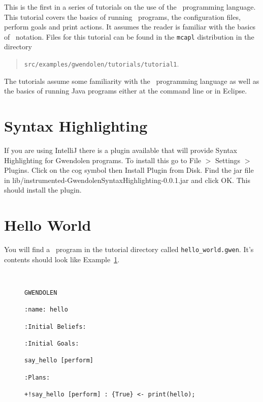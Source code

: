 \label{tutorial:gwendolen:introduction}
This is the first in a series of tutorials on the use of
the \gwendolen\ programming language.  This tutorial
covers the basics of running \gwendolen\
programs, the configuration
files, perform
goals and print
actions.  It assumes the reader is
familiar with the basics of \prolog\ notation.  Files for this
tutorial can be found in the
\texttt{mcapl} distribution in the directory
\begin{quote}
\texttt{src/examples/gwendolen/tutorials/tutorial1}.
\end{quote}
%
The tutorials assume some familiarity with the \prolog\ programming
language as well as the basics of running Java programs either at the
command line or in Eclipse.

\section{Syntax Highlighting}
If you are using IntelliJ there is a plugin available that will provide Syntax Highlighting for Gwendolen programs.  To install this go to File $>$ Settings $>$ Plugins.  Click on the cog symbol then Install Plugin from Disk.  Find the jar file in lib/instrumented-GwendolenSyntaxHighlighting-0.0.1.jar and click OK.  This should install the plugin.

\section{Hello World}

\begin{sloppypar}
You will find a \gwendolen\ program in the tutorial directory
called \texttt{hello\_world.gwen}.
It's contents should look like Example~\ref{code:hello_world}.
\end{sloppypar}
\begin{figure}[htb]
\begin{ourexample}
\label{code:hello_world} \quad \\
\begin{lstlisting}[basicstyle=\footnotesize\sffamily,language=Gwendolen,style=easslisting]
GWENDOLEN

:name: hello

:Initial Beliefs:

:Initial Goals:

say_hello [perform]

:Plans:

+!say_hello [perform] : {True} <- print(hello);
\end{lstlisting}
\end{ourexample}
\end{figure}

